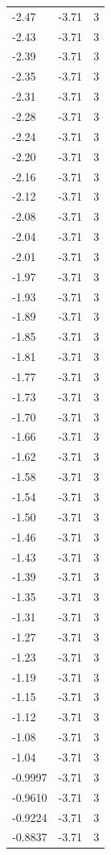 \begin{longtable}{lrr}
  -2.47 & -3.71 & 3 \\
  -2.43 & -3.71 & 3 \\
  -2.39 & -3.71 & 3 \\
  -2.35 & -3.71 & 3 \\
  -2.31 & -3.71 & 3 \\
  -2.28 & -3.71 & 3 \\
  -2.24 & -3.71 & 3 \\
  -2.20 & -3.71 & 3 \\
  -2.16 & -3.71 & 3 \\
  -2.12 & -3.71 & 3 \\
  -2.08 & -3.71 & 3 \\
  -2.04 & -3.71 & 3 \\
  -2.01 & -3.71 & 3 \\
  -1.97 & -3.71 & 3 \\
  -1.93 & -3.71 & 3 \\
  -1.89 & -3.71 & 3 \\
  -1.85 & -3.71 & 3 \\
  -1.81 & -3.71 & 3 \\
  -1.77 & -3.71 & 3 \\
  -1.73 & -3.71 & 3 \\
  -1.70 & -3.71 & 3 \\
  -1.66 & -3.71 & 3 \\
  -1.62 & -3.71 & 3 \\
  -1.58 & -3.71 & 3 \\
  -1.54 & -3.71 & 3 \\
  -1.50 & -3.71 & 3 \\
  -1.46 & -3.71 & 3 \\
  -1.43 & -3.71 & 3 \\
  -1.39 & -3.71 & 3 \\
  -1.35 & -3.71 & 3 \\
  -1.31 & -3.71 & 3 \\
  -1.27 & -3.71 & 3 \\
  -1.23 & -3.71 & 3 \\
  -1.19 & -3.71 & 3 \\
  -1.15 & -3.71 & 3 \\
  -1.12 & -3.71 & 3 \\
  -1.08 & -3.71 & 3 \\
  -1.04 & -3.71 & 3 \\
  -0.9997 & -3.71 & 3 \\
  -0.9610 & -3.71 & 3 \\
  -0.9224 & -3.71 & 3 \\
  -0.8837 & -3.71 & 3 \\

\end{longtable}
